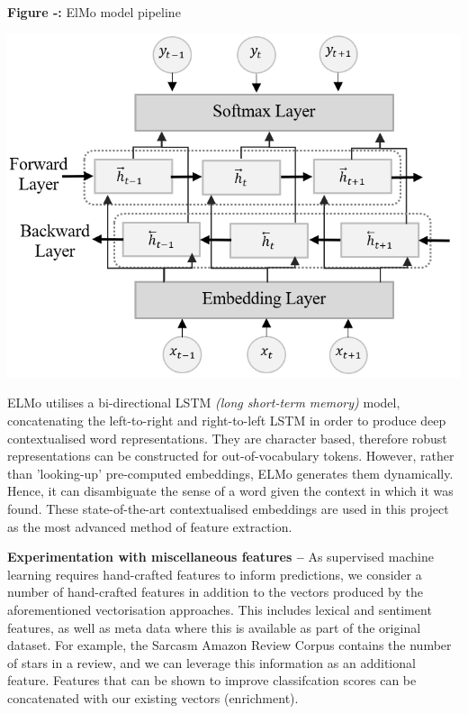 \documentclass[12pt,a4paper]{article}
\begin{document}
\begin{minipage}{0.4\textwidth}
	\begin{center}
		\textbf{Figure -:} ElMo model pipeline
	\end{center}
	\begin{center}
		\includegraphics[width=1\textwidth]{Images/elmo_diagram.png}
		\label{ElMo Model}
	\end{center}
\end{minipage} \hfill
\begin{minipage}{0.55\textwidth}
	ELMo utilises a bi-directional LSTM \textit{(long short-term memory)} model, concatenating the left-to-right and right-to-left LSTM in order to produce deep contextualised word representations. They are character based, therefore robust representations can be constructed for out-of-vocabulary tokens. However, rather than 'looking-up' pre-computed embeddings, ELMo generates them dynamically. Hence, it can disambiguate the sense of a word given the context in which it was found. These state-of-the-art contextualised embeddings are used in this project as the most advanced method of feature extraction.\\
\end{minipage}

\noindent \textbf{Experimentation with miscellaneous features --}
As supervised machine learning requires hand-crafted features to inform  predictions, we consider a number of hand-crafted features in addition to the vectors produced by the aforementioned vectorisation approaches. This includes lexical and sentiment features, as well as meta data where this is available as part of the original dataset. For example, the Sarcasm Amazon Review Corpus contains the number of stars in a review, and we can leverage this information as an additional feature. Features that can be shown to improve classifcation scores can be concatenated with our existing vectors (enrichment).\\
\end{document}
